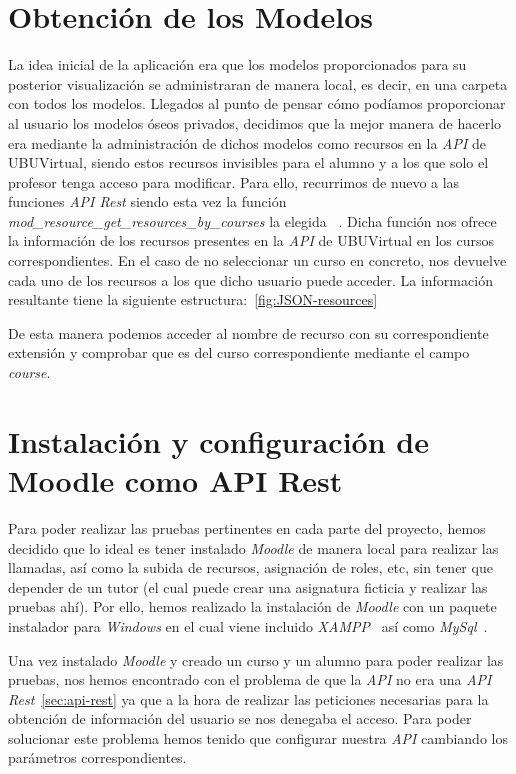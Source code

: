 \section{Obtención de los Modelos}
La idea inicial de la aplicación era que los modelos proporcionados para su posterior visualización se administraran de manera local, es decir, en una carpeta con todos los modelos. Llegados al punto de pensar cómo podíamos proporcionar al usuario los modelos óseos privados, decidimos que la mejor manera de hacerlo era mediante la administración de dichos modelos como recursos en la \textit{API} de UBUVirtual, siendo estos recursos invisibles para el alumno y a los que solo el profesor tenga acceso para modificar. Para ello, recurrimos de nuevo a las funciones \textit{API Rest} siendo esta vez la función \textit{mod_resource_get_resources_by_courses} la elegida ~\cite{moodle:web-service-api-functions}. Dicha función nos ofrece la información de los recursos presentes en la \textit{API} de UBUVirtual en los cursos correspondientes. En el caso de no seleccionar un curso en concreto, nos devuelve cada uno de los recursos a los que dicho usuario puede acceder. La información resultante tiene la siguiente estructura:~\ref{fig:JSON-resources}

De esta manera podemos acceder al nombre de recurso con su correspondiente extensión y comprobar que es del curso correspondiente mediante el campo \textit{course}.

\section{Instalación y configuración de Moodle como API Rest}
Para poder realizar las pruebas pertinentes en cada parte del proyecto, hemos decidido que lo ideal es tener instalado \textit{Moodle} de manera local para realizar las llamadas, así como la subida de recursos, asignación de roles, etc, sin tener que depender de un tutor (el cual puede crear una asignatura ficticia y realizar las pruebas ahí). Por ello, hemos realizado la instalación de \textit{Moodle} con un paquete instalador para \textit{Windows} en el cual viene incluido \textit{XAMPP}~\cite{wiki:xampp} así como \textit{MySql}~\cite{wiki:mysql}.

Una vez instalado \textit{Moodle} y creado un curso y un alumno para poder realizar las pruebas, nos hemos encontrado con el problema de que la \textit{API} no era una \textit{API Rest}~\ref{sec:api-rest} ya que a la hora de realizar las peticiones necesarias para la obtención de información del usuario se nos denegaba el acceso. Para poder solucionar este problema hemos tenido que configurar nuestra \textit{API} cambiando los parámetros correspondientes.

